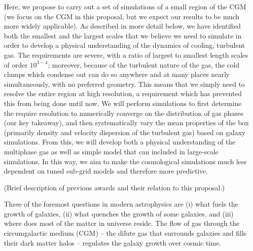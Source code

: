 \documentclass[11pt,letterpaper,english]{article}
\begin{document}
Here, we propose to carry out a set of simulations of a small region of the CGM (we focus on the CGM in this proposal, but we expect our results to be much more widely applicable).  As described in more detail below, we have identified both the smallest and the largest scales that we believe we need to simulate in order to develop a physical understanding of the dynamics of cooling, turbulent gas.  The requirements are severe, with a ratio of largest to smallest length scales of order $10^{3-4}$; moreover, because of the turbulent nature of the gas, the cold clumps which condense out can do so anywhere and at many places nearly simultaneously, with no preferred geometry.  This means that we simply need to resolve the entire region at high resolution, a requirement which has prevented this from being done until now.  We will perform simulations to first determine the require resolution to numerically converge on the distribution of gas phases (our key takeaway), and then systematically vary the mean properties of the box (primarily density and velocity dispersion of the turbulent gas) based on galaxy simulations.  From this, we will develop both a physical understanding of the multiphase gas as well as simple model that can included in large-scale simulations.  In this way, we aim to make the cosmological simulations much less dependent on tuned sub-grid models and therefore more predictive.







(Brief description of previous awards and their relation to this proposal.)

Three of the foremost questions in modern astrophysics are (i) what fuels the growth of galaxies, (ii) what quenches the growth of some galaxies, and (iii) where does most of the matter in universe reside. The flow of gas through the circumgalactic medium (CGM) -- the dilute gas that surrounds galaxies and fills their dark matter halos -- regulates the galaxy growth over cosmic time. 
\end{document}
